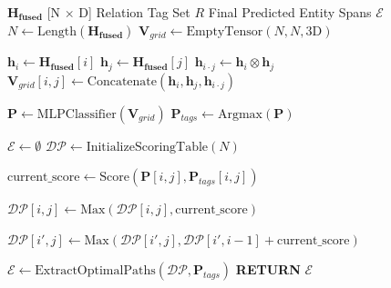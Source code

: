 \documentclass[12pt]{article}
\begin{document}
\begin{algorithm}
\caption{Grid-Based Discontinuous Entity Decoder}
\label{alg:module4}
\begin{algorithmic}[1]
\REQUIRE $\mathbf{H_{fused}}$ [N $\times$ D]
\REQUIRE Relation Tag Set $R$ 
\ENSURE Final Predicted Entity Spans $\mathcal{E}$
\vspace{0,5cm}
\STATE $N \leftarrow \text{Length}(\mathbf{H_{fused}})$
\STATE $\mathbf{V}_{grid} \leftarrow \text{EmptyTensor}(N, N, \text{3D})$

        \STATE $\mathbf{h}_i \leftarrow \mathbf{H_{fused}}[i]$
        \STATE $\mathbf{h}_j \leftarrow \mathbf{H_{fused}}[j]$
        \STATE $\mathbf{h}_{i \cdot j} \leftarrow \mathbf{h}_i \otimes \mathbf{h}_j$
        \STATE $\mathbf{V}_{grid}[i, j] \leftarrow \text{Concatenate}(\mathbf{h}_i, \mathbf{h}_j, \mathbf{h}_{i \cdot j})$
    \ENDFOR
\ENDFOR

\STATE $\mathbf{P} \leftarrow \text{MLPClassifier}(\mathbf{V}_{grid})$ 
\STATE $\mathbf{P}_{tags} \leftarrow \text{Argmax}(\mathbf{P})$ 

\STATE $\mathcal{E} \leftarrow \emptyset$
\STATE $\mathcal{DP} \leftarrow \text{InitializeScoringTable}(N)$

        \STATE $\text{current\_score} \leftarrow \text{Score}(\mathbf{P}[i, j], \mathbf{P}_{tags}[i, j])$

            \STATE $\mathcal{DP}[i, j] \leftarrow \text{Max}(\mathcal{DP}[i, j], \text{current\_score})$
        \ENDIF

                \STATE $\mathcal{DP}[i', j] \leftarrow \text{Max}(\mathcal{DP}[i', j], \mathcal{DP}[i', i-1] + \text{current\_score})$
            \ENDFOR
        \ENDIF
    \ENDFOR
\ENDFOR

\STATE $\mathcal{E} \leftarrow \text{ExtractOptimalPaths}(\mathcal{DP}, \mathbf{P}_{tags})$
\STATE \textbf{RETURN} $\mathcal{E}$
\end{algorithmic}
\end{algorithm}
\end{document}
